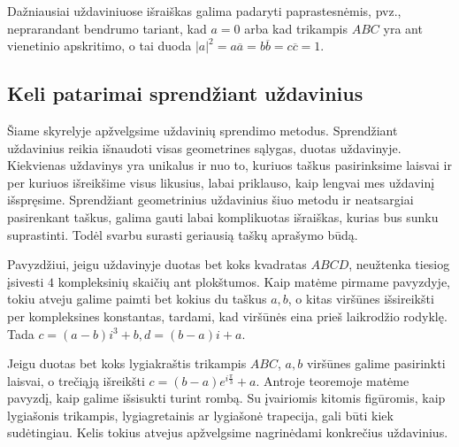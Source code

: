 \documentclass[11pt,a4paper,twoside]{book}
\theoremstyle{definition} \newtheorem*{api}{Apibrėžimas}
\theoremstyle{remark} \newtheorem*{pastaba}{Pastaba}
\begin{document}
Dažniausiai uždaviniuose išraiškas galima padaryti paprastesnėmis, pvz., neprarandant bendrumo tariant, kad $a=0$ arba kad trikampis $ABC$ yra ant vienetinio apskritimo, o tai duoda $|a|^2=a\overline{a}=b\overline{b}=c\overline{c}=1$.


\subsection*{Keli patarimai sprendžiant uždavinius}

Šiame skyrelyje apžvelgsime uždavinių sprendimo metodus. Sprendžiant uždavinius reikia išnaudoti visas geometrines sąlygas, duotas uždavinyje. Kiekvienas uždavinys yra unikalus ir nuo to, kuriuos taškus pasirinksime laisvai ir per kuriuos išreikšime visus likusius, labai priklauso, kaip lengvai mes uždavinį išspręsime. Sprendžiant geometrinius uždavinius šiuo metodu ir neatsargiai pasirenkant taškus, galima gauti labai komplikuotas išraiškas, kurias bus sunku suprastinti. Todėl svarbu surasti geriausią taškų aprašymo būdą.



Pavyzdžiui, jeigu uždavinyje duotas bet koks kvadratas $ABCD$, neužtenka tiesiog įsivesti $4$ kompleksinių skaičių ant plokštumos. Kaip matėme pirmame pavyzdyje, tokiu atveju galime paimti bet kokius du taškus $a, b$, o kitas viršūnes išsireikšti per kompleksines konstantas, tardami, kad viršūnės eina prieš laikrodžio rodyklę. Tada $c=(a-b)i^3+b,  d=(b-a)i + a$.

Jeigu duotas bet koks lygiakraštis trikampis $ABC$, $a, b$ viršūnes galime pasirinkti laisvai, o trečiąją išreikšti $c=(b-a)e^{i\frac{\pi}{3}}+a$. Antroje teoremoje matėme pavyzdį, kaip galime išsisukti turint rombą. Su įvairiomis kitomis figūromis, kaip lygiašonis trikampis, lygiagretainis ar lygiašonė trapecija, gali būti kiek sudėtingiau. Kelis tokius atvejus apžvelgsime nagrinėdami konkrečius uždavinius.
\end{document}
